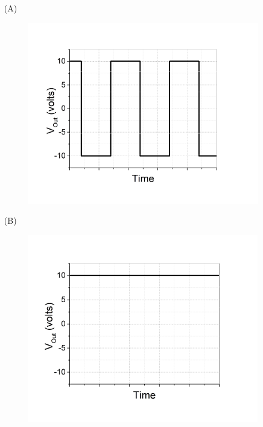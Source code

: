 \documentclass[journal,12pt,twocolumn]{IEEEtran}
\begin{document}
\begin{enumerate}
  \item[(A)]
  \setcounter{figure}{0}
    \begin{figure}[h]
        \centering
        \includegraphics[width=0.8\linewidth]{figs/1.png}
        \label{fig:ann_label}
    \end{figure}
    
  \item[(B)]
  \setcounter{figure}{1}
    \begin{figure}[h]
        \centering
        \includegraphics[width=0.8\linewidth]{figs/2.png}
        \label{fig:sww_label}
    \end{figure}
    

\end{enumerate}
\end{document}
